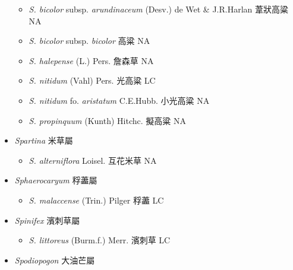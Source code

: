 \begin{itemize}
  \begin{itemize}
        \item[] \textit{S. bicolor} subsp. \textit{arundinaceum} (Desv.) de Wet \& J.R.Harlan  葦狀高粱   NA
        \item[] \textit{S. bicolor} subsp. \textit{bicolor}   高粱   NA
        \item[] \textit{S. halepense} (L.) Pers.  詹森草   NA
        \item[] \textit{S. nitidum} (Vahl) Pers.  光高粱   LC
        \item[] \textit{S. nitidum} fo. \textit{aristatum} C.E.Hubb.  小光高粱   NA
        \item[] \textit{S. propinquum} (Kunth) Hitchc.  擬高粱   NA
  \end{itemize}
 \item[] \textit{Spartina} 米草屬
                                
  \begin{itemize}
        \item[] \textit{S. alterniflora} Loisel.  互花米草   NA
  \end{itemize}
 \item[] \textit{Sphaerocaryum} 稃藎屬
                                
  \begin{itemize}
        \item[] \textit{S. malaccense} (Trin.) Pilger  稃藎   LC
  \end{itemize}
 \item[] \textit{Spinifex} 濱刺草屬
                                
  \begin{itemize}
        \item[] \textit{S. littoreus} (Burm.f.) Merr.  濱刺草   LC
  \end{itemize}
 \item[] \textit{Spodiopogon} 大油芒屬
                                

\end{itemize}
